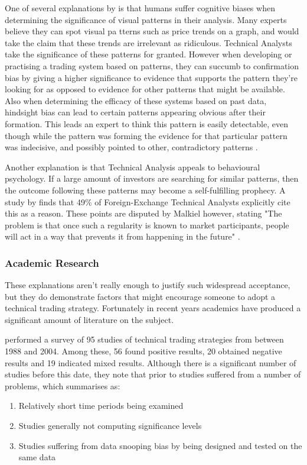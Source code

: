 \documentclass{article}
\theoremstyle{definition}
\begin{document}
One of several explanations by \cite[p.45-71]{aronson2011evidence} is that humans suffer cognitive biases when determining the significance of visual patterns in their analysis. Many experts believe they can spot visual pa	tterns such as price trends on a graph, and would take the claim that these trends are irrelevant as ridiculous. Technical Analysts take the significance of these patterns for granted. However when developing or practising a trading system based on patterns, they can succumb to confirmation bias by giving a higher significance to evidence that supports the pattern they're looking for as opposed to evidence for other patterns that might be available. Also when determining the efficacy of these systems based on past data, hindsight bias can lead to certain patterns appearing obvious after their formation. This leads an expert to think this pattern is easily detectable, even though while the pattern was forming the evidence for that particular pattern was indecisive, and possibly pointed to other, contradictory patterns \cite[p.62]{aronson2011evidence}.

Another explanation is that Technical Analysis appeals to behavioural psychology. If a large amount of investors are searching for similar patterns, then the outcome following these patterns may become a self-fulfilling prophecy. A study by \cite{examininguse1997} finds that 49\% of Foreign-Exchange Technical Analysts explicitly cite this as a reason. These points are disputed by Malkiel however, stating "The problem is that once such a regularity is known to market participants, people will act in a way that prevents it from happening in the future" \cite[p.162]{randomwalk2012}.

\subsubsection{Academic Research}

These explanations aren't really enough to justify such widespread acceptance, but they do demonstrate factors that might encourage someone to adopt a technical trading strategy. Fortunately in recent years academics have produced a significant amount of literature on the subject.

\cite{taprofitability} performed a survey of 95 studies of technical trading strategies from between 1988 and 2004. Among these, 56 found positive results, 20 obtained negative results and 19 indicated mixed results. Although there is a significant number of studies before this date, they note that prior to \cite{lukac1988} studies suffered from a number of problems, which \cite{brock1992} summarises as:
\begin{enumerate}
\item Relatively short time periods being examined 
\item Studies generally not computing significance levels 
\item Studies suffering from data snooping bias by being designed and tested on the same data
\end{enumerate}
\end{document}
